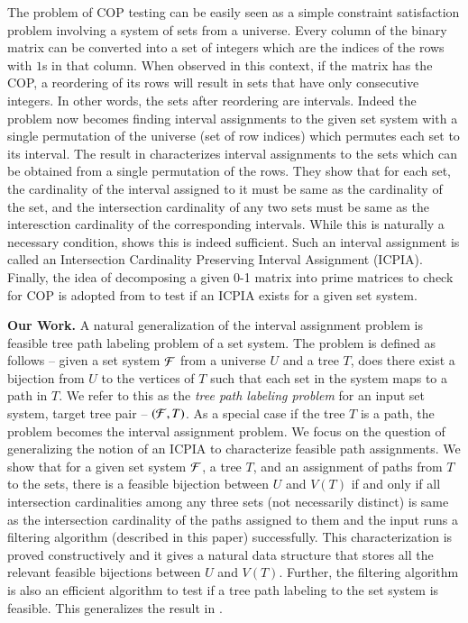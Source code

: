 \documentclass[synopsis,MS]             %
              {iitmdiss}
\begin{document}
The problem of COP testing can be easily seen as a simple constraint
satisfaction problem involving a system of sets from a universe. Every
column of the binary matrix can be converted into a set of integers
which are the indices of the rows with $1$s in that column. When
observed in this context, if the matrix has the COP, a reordering of
its rows will result in sets that have only consecutive integers. In
other words, the sets after reordering are intervals. Indeed the
problem now becomes finding interval assignments to the given set
system \cite{nsnrs09} with a single permutation of the universe (set
of row indices) which permutes each set to its interval. The result in
\cite{nsnrs09} characterizes interval assignments to the sets which
can be obtained from a single permutation of the rows.  They show that
for each set, the cardinality of the interval assigned to it must be
same as the cardinality of the set, and the intersection cardinality
of any two sets must be same as the interesction cardinality of the
corresponding intervals.  While this is naturally a necessary
condition, \cite{nsnrs09} shows this is indeed sufficient.  Such an
interval assignment is called an Intersection Cardinality Preserving
Interval Assignment (ICPIA).  Finally, the idea of decomposing a given
0-1 matrix into prime matrices to check for COP is adopted from
\cite{wlh02} to test if an ICPIA exists for a given set system.

\noindent 
{\bf Our Work.}  A natural generalization of the interval
assignment problem is feasible tree path labeling problem of a set
system. The problem is defined as follows -- given a set system ${\cal F}$
from a universe $U$ and a tree $T$, does there exist a bijection from
$U$ to the vertices of $T$ such that each set in the system maps to a
path in $T$.  We refer to this as the {\em tree path labeling problem}
for an input set system, target tree pair -- $({\cal F},T)$. As a special
case if the tree $T$ is a path, the problem becomes the interval
assignment problem.  We focus on the question of generalizing the
notion of an ICPIA \cite{nsnrs09} to characterize feasible path
assignments.  We show that for a given set system ${\cal F}$, a tree $T$,
and an assignment of paths from $T$ to the sets, there is a feasible
bijection between $U$ and $V(T)$ if and only if all intersection
cardinalities among any three sets (not necessarily distinct) is same
as the intersection cardinality of the paths assigned to them and the
input runs a filtering algorithm (described in this paper)
successfully.  This characterization is proved constructively and it
gives a natural data structure that stores all the relevant feasible
bijections between $U$ and $V(T)$.  Further, the filtering algorithm
is also an efficient algorithm to test if a tree path labeling to the
set system is feasible.  This generalizes the result in
\cite{nsnrs09}.
\end{document}
